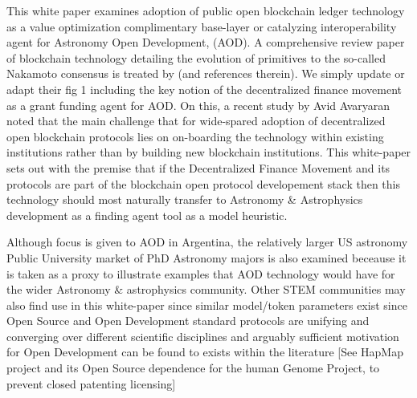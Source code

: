\documentclass[final,5p,times,twocolumn,authoryear]{elsarticle}
\begin{document}
This white paper examines adoption of public open blockchain ledger technology as a value optimization complimentary base-layer or catalyzing interoperability agent for Astronomy Open Development, (AOD). A comprehensive review paper of blockchain technology detailing the evolution of primitives to the so-called Nakamoto consensus is treated by \cite{20d30b4efb014b21b7ab27f5218692ab} (and references therein). We simply update or adapt their fig 1 including the key notion of the decentralized finance movement as a grant funding agent for AOD. On this, a recent study by Avid Avaryaran noted that the main challenge that for wide-spared adoption of decentralized open blockchain protocols lies on on-boarding the technology within existing institutions rather than by building new blockchain institutions. This white-paper sets out with the premise that if the Decentralized Finance Movement and its protocols are part of the blockchain open protocol developement stack then this technology should most naturally transfer to Astronomy \& Astrophysics development as a finding agent tool as a model heuristic.

Although focus is given to AOD in Argentina, the relatively larger US astronomy Public University market of PhD Astronomy majors is also examined beceause it is taken as a proxy to illustrate examples that AOD technology would have for the wider Astronomy \& astrophysics community. Other STEM communities may also find use in this white-paper since similar model/token parameters exist since Open Source and Open Development standard protocols are unifying and converging over different scientific disciplines and arguably sufficient motivation for Open Development can be found to exists within the literature [See HapMap project and its Open Source dependence for the human Genome Project, \cite{GITTER2008529} to prevent closed patenting licensing]

\end{document}
